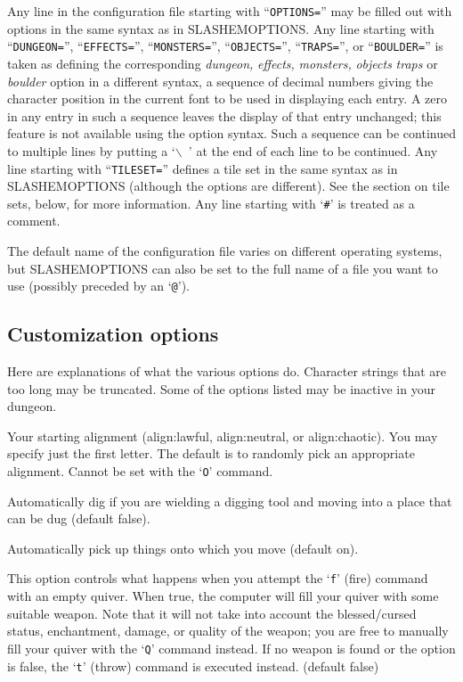 Any line in the configuration file starting with ``{\tt OPTIONS=}'' may be
filled out with options in the same syntax as in SLASHEMOPTIONS.
Any line starting with ``{\tt DUNGEON=}'', ``{\tt EFFECTS=}'', ``{\tt MONSTERS=}'',
``{\tt OBJECTS=}'', ``{\tt TRAPS=}'', or ``{\tt BOULDER=}''
is taken as defining the corresponding
{\it dungeon,\/} 
{\it effects,\/} 
{\it monsters,\/} 
{\it objects\/} 
{\it traps\/} 
or
{\it boulder\/} 
option in a different syntax,
a sequence of decimal numbers giving the character position
in the current font to be used in displaying each entry.
A zero in any entry in such a sequence leaves the display of that
entry unchanged; this feature is not available using the option syntax.
Such a sequence can be continued to multiple lines by putting a `{\tt $\backslash$ }'
at the end of each line to be continued.
Any line starting with ``{\tt TILESET=}'' defines a tile set in the same syntax
as in SLASHEMOPTIONS (although the options are different). See the
section on tile sets, below, for more information.
Any line starting with `{\tt \#}' is treated as a comment.

The default name of the configuration file varies on different
operating systems, but SLASHEMOPTIONS can also be set to
the full name of a file you want to use (possibly preceded by an `{\tt @}').
\subsection*{Customization options}


Here are explanations of what the various options do.
Character strings that are too long may be truncated.
Some of the options listed may be inactive in your dungeon.
\blist{}

\item[\ib{align}]
Your starting alignment (align:lawful, align:neutral,
or align:chaotic).  You may specify just the first letter.
The default is to randomly pick an appropriate alignment.
Cannot be set with the `{\tt O}' command.

\item[\ib{autodig}]
Automatically dig if you are wielding a digging tool and moving into a place
that can be dug (default false).

\item[\ib{autopickup}]
Automatically pick up things onto which you move (default on).

\item[\ib{autoquiver}]
This option controls what happens when you attempt the `{\tt f}' (fire)
command with an empty quiver.  When true, the computer will fill
your quiver with some suitable weapon.  Note that it will not take
into account the blessed/cursed status, enchantment, damage, or
quality of the weapon; you are free to manually fill your quiver with
the `{\tt Q}' command instead.  If no weapon is found or the option is
false, the `{\tt t}' (throw) command is executed instead.  (default false)


